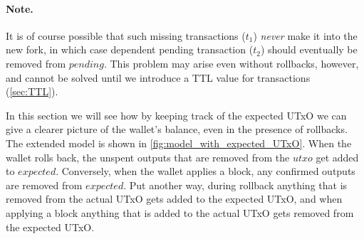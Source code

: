 \documentclass{article}
\theoremstyle{definition}{
  \newtheorem{lemma}{Lemma}[section] %
  \newtheorem{definition}[lemma]{Definition}
}
\theoremstyle{theorem}{
  \newtheorem{invariant}[lemma]{Invariant}
  \newtheorem{proofobligation}[lemma]{Proof Obligation}
}
\numberwithin{equation}{lemma}
\begin{document}
\paragraph{Note.}
It is of course possible that such missing transactions ($t_1$) \emph{never}
make it into the new fork, in which case dependent pending transaction ($t_2$)
should eventually be removed from $\mathit{pending}$. This problem may arise
even without rollbacks, however, and cannot be solved until we introduce a TTL
value for transactions (\cref{sec:TTL}).

In this section we will see how by keeping track of the expected UTxO we can
give a clearer picture of the wallet's balance, even in the presence of
rollbacks. The extended model is shown in
\cref{fig:model_with_expected_UTxO}. When the wallet rolls back, the
unspent outputs that are removed from the $\mathit{utxo}$ get added to
$\mathit{expected}$. Conversely, when the wallet applies a block, any confirmed
outputs are removed from $\mathit{expected}$. Put another way, during rollback
anything that is removed from the actual UTxO gets added to the expected UTxO,
and when applying a block anything that is added to the actual UTxO gets
removed from the expected UTxO.
\end{document}

